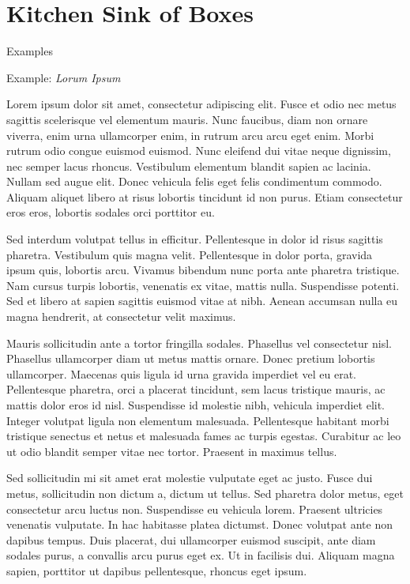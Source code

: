 \documentclass[a4paper, 11pt]{report}
\begin{document}
\makedocumenttitlepage


\tableofcontents
\newpage


\section{Kitchen Sink of Boxes}

Examples

\begin{example}{Example: \textit{Lorum Ipsum}}   %


Lorem ipsum dolor sit amet, consectetur adipiscing elit. Fusce et odio nec metus sagittis scelerisque vel elementum mauris. Nunc faucibus, diam non ornare viverra, enim urna ullamcorper enim, in rutrum arcu arcu eget enim. Morbi rutrum odio congue euismod euismod. Nunc eleifend dui vitae neque dignissim, nec semper lacus rhoncus. Vestibulum elementum blandit sapien ac lacinia. Nullam sed augue elit. Donec vehicula felis eget felis condimentum commodo. Aliquam aliquet libero at risus lobortis tincidunt id non purus. Etiam consectetur eros eros, lobortis sodales orci porttitor eu.

Sed interdum volutpat tellus in efficitur. Pellentesque in dolor id risus sagittis pharetra. Vestibulum quis magna velit. Pellentesque in dolor porta, gravida ipsum quis, lobortis arcu. Vivamus bibendum nunc porta ante pharetra tristique. Nam cursus turpis lobortis, venenatis ex vitae, mattis nulla. Suspendisse potenti. Sed et libero at sapien sagittis euismod vitae at nibh. Aenean accumsan nulla eu magna hendrerit, at consectetur velit maximus.

Mauris sollicitudin ante a tortor fringilla sodales. Phasellus vel consectetur nisl. Phasellus ullamcorper diam ut metus mattis ornare. Donec pretium lobortis ullamcorper. Maecenas quis ligula id urna gravida imperdiet vel eu erat. Pellentesque pharetra, orci a placerat tincidunt, sem lacus tristique mauris, ac mattis dolor eros id nisl. Suspendisse id molestie nibh, vehicula imperdiet elit. Integer volutpat ligula non elementum malesuada. Pellentesque habitant morbi tristique senectus et netus et malesuada fames ac turpis egestas. Curabitur ac leo ut odio blandit semper vitae nec tortor. Praesent in maximus tellus.

Sed sollicitudin mi sit amet erat molestie vulputate eget ac justo. Fusce dui metus, sollicitudin non dictum a, dictum ut tellus. Sed pharetra dolor metus, eget consectetur arcu luctus non. Suspendisse eu vehicula lorem. Praesent ultricies venenatis vulputate. In hac habitasse platea dictumst. Donec volutpat ante non dapibus tempus. Duis placerat, dui ullamcorper euismod suscipit, ante diam sodales purus, a convallis arcu purus eget ex. Ut in facilisis dui. Aliquam magna sapien, porttitor ut dapibus pellentesque, rhoncus eget ipsum.


\end{example}
\end{document}
